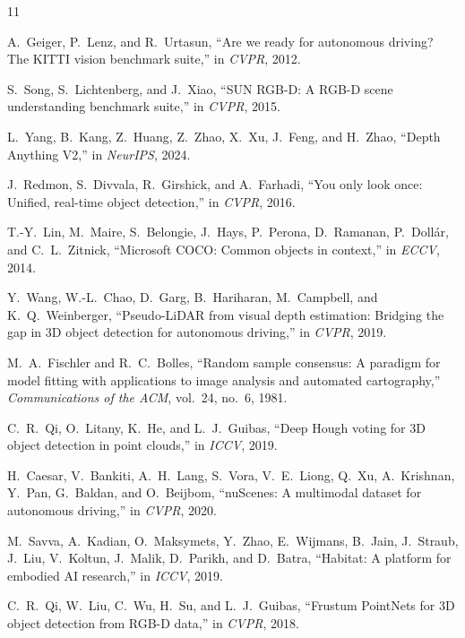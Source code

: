 \documentclass[
  12pt,
]{fphw}
\begin{document}
\begin{thebibliography}{11}

A.~Geiger, P.~Lenz, and R.~Urtasun, ``Are we ready for autonomous driving? The KITTI vision benchmark
suite,'' in \emph{CVPR}, 2012.

S.~Song, S.~Lichtenberg, and J.~Xiao, ``SUN RGB-D: A RGB-D scene understanding benchmark suite,'' in
\emph{CVPR}, 2015.

L.~Yang, B.~Kang, Z.~Huang, Z.~Zhao, X.~Xu, J.~Feng, and H.~Zhao, ``Depth Anything V2,'' in
\emph{NeurIPS}, 2024.

J.~Redmon, S.~Divvala, R.~Girshick, and A.~Farhadi, ``You only look once: Unified, real-time object
detection,'' in \emph{CVPR}, 2016.

T.-Y.~Lin, M.~Maire, S.~Belongie, J.~Hays, P.~Perona, D.~Ramanan, P.~Doll\'ar, and C.~L.~Zitnick,
``Microsoft COCO: Common objects in context,'' in \emph{ECCV}, 2014.

Y.~Wang, W.-L.~Chao, D.~Garg, B.~Hariharan, M.~Campbell, and K.~Q.~Weinberger, ``Pseudo-LiDAR from visual
depth estimation: Bridging the gap in 3D object detection for autonomous driving,'' in \emph{CVPR}, 2019.

M.~A.~Fischler and R.~C.~Bolles, ``Random sample consensus: A paradigm for model fitting with applications
to image analysis and automated cartography,'' \emph{Communications of the ACM}, vol.~24, no.~6, 1981.

C.~R.~Qi, O.~Litany, K.~He, and L.~J.~Guibas, ``Deep Hough voting for 3D object detection in point
clouds,'' in \emph{ICCV}, 2019.

H.~Caesar, V.~Bankiti, A.~H.~Lang, S.~Vora, V.~E.~Liong, Q.~Xu, A.~Krishnan, Y.~Pan, G.~Baldan, and
O.~Beijbom, ``nuScenes: A multimodal dataset for autonomous driving,'' in \emph{CVPR}, 2020.

M.~Savva, A.~Kadian, O.~Maksymets, Y.~Zhao, E.~Wijmans, B.~Jain, J.~Straub, J.~Liu, V.~Koltun,
J.~Malik, D.~Parikh, and D.~Batra, ``Habitat: A platform for embodied AI research,'' in \emph{ICCV}, 2019.

C.~R.~Qi, W.~Liu, C.~Wu, H.~Su, and L.~J.~Guibas, ``Frustum PointNets for 3D object detection from RGB-D
data,'' in \emph{CVPR}, 2018.

\end{thebibliography}
\end{document}
